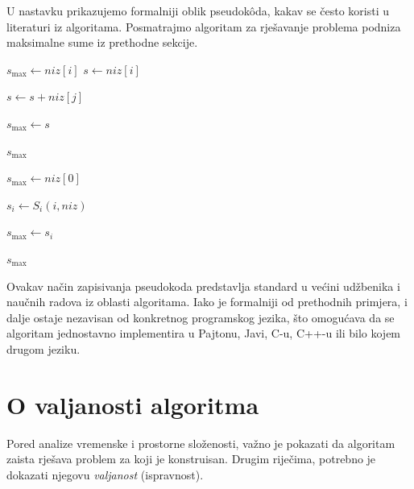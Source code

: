 U nastavku prikazujemo formalniji oblik pseudok\^oda, kakav se često koristi u literaturi iz algoritama. Posmatrajmo algoritam za rješavanje problema podniza maksimalne sume iz prethodne sekcije.

\begin{algorithm}[!ht]
	\caption{Funkcija $S_i(i)$}
	\label{S_i}
	\begin{algorithmic}[1]

		\State $s_{\max} \gets niz[i]$
		\State $s \gets niz[i]$
		
		\State $s \gets s + niz[j]$
		
		\State $s_{\max} \gets s$
		\EndIf
		
		\EndFor
		
		\State \Return $s_{\max}$
		
		\EndProcedure
	\end{algorithmic}
\end{algorithm}

\begin{algorithm}[H]
	\caption{Funkcija $S$}
	\label{S}
	\begin{algorithmic}[1]
		\State $s_{\max} \gets niz[0]$
		
		
		\State $s_i \gets S_i(i,niz)$
		
		\State $s_{\max} \gets s_i$
		\EndIf
		
		\EndFor
		
		\State \Return $s_{\max}$
		
		\EndProcedure
	\end{algorithmic}
\end{algorithm}

Ovakav način zapisivanja pseudokoda predstavlja standard u većini udžbenika i naučnih radova iz oblasti algoritama. Iako je formalniji od prethodnih primjera, i dalje ostaje nezavisan od konkretnog programskog jezika, što omogućava da se algoritam jednostavno implementira u Pajtonu, Javi, C-u, C++-u ili bilo kojem drugom jeziku.

\section{O valjanosti algoritma}

Pored analize vremenske i prostorne složenosti, važno je pokazati da algoritam zaista rješava problem za koji je konstruisan. Drugim riječima, potrebno je dokazati njegovu \textit{valjanost} (ispravnost).


